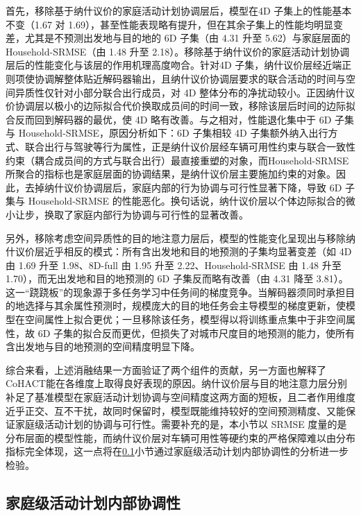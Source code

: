 首先，移除基于纳什议价的家庭活动计划协调层后，模型在4D 子集上的性能基本不变（1.67 对 1.69），甚至性能表现略有提升，但在其余子集上的性能均明显变差，尤其是不预测出发地与目的地的 6D 子集（由 4.31 升至 5.62）与家庭层面的 Household-SRMSE（由 1.48 升至 2.18）。移除基于纳什议价的家庭活动计划协调层后的性能变化与该层的作用机理高度吻合。针对4D 子集，纳什议价层经近端正则项使协调解整体贴近解码器输出，且纳什议价协调层要求的联合活动的时间与空间异质性仅针对小部分联合出行成员，对 4D 整体分布的净扰动较小。正因纳什议价协调层以极小的边际拟合代价换取成员间的时间一致，移除该层后时间的边际拟合反而回到解码器的最优，使 4D 略有改善。与之相对，性能退化集中于 6D 子集与 Household-SRMSE，原因分析如下：6D 子集相较 4D 子集额外纳入出行方式、联合出行与驾驶等行为属性，正是纳什议价层经车辆可用性约束与联合一致性约束（耦合成员间的方式与联合出行）最直接重塑的对象，而Household-SRMSE所聚合的指标也是家庭层面的协调结果，是纳什议价层主要施加约束的对象。因此，去掉纳什议价协调层后，家庭内部的行为协调与可行性显著下降，导致 6D 子集与 Household-SRMSE 的性能恶化。换句话说，纳什议价层以个体边际拟合的微小让步，换取了家庭内部行为协调与可行性的显著改善。

另外，移除考虑空间异质性的目的地注意力层后，模型的性能变化呈现出与移除纳什议价层近乎相反的模式：所有含出发地和目的地预测的子集均显著变差（如 4D 由 1.69 升至 1.98、8D-full 由 1.95 升至 2.22、Household-SRMSE 由 1.48 升至 1.70），而无出发地和目的地预测的 6D 子集反而略有改善（由 4.31 降至 3.81）。这一``跷跷板''的现象源于多任务学习中任务间的梯度竞争。当解码器须同时承担目的地选择与其余属性预测时，规模庞大的目的地任务会主导模型的梯度更新，使模型在空间属性上拟合更优；一旦移除该任务，模型得以将训练重点集中于非空间属性，故 6D 子集的拟合反而更优，但损失了对城市尺度目的地预测的能力，使所有含出发地与目的地预测的空间精度明显下降。

综合来看，上述消融结果一方面验证了两个组件的贡献，另一方面也解释了CoHACT能在各维度上取得良好表现的原因。纳什议价层与目的地注意力层分别补足了基准模型在家庭活动计划协调与空间精度这两方面的短板，且二者作用维度近乎正交、互不干扰，故同时保留时，模型既能维持较好的空间预测精度、又能保证家庭级活动计划的协调与可行性。需要补充的是，本小节以 SRMSE 度量的是分布层面的模型性能，而纳什议价层对车辆可用性等硬约束的严格保障难以由分布指标完全体现，这一点将在\ref{subsec.cohact.experiment.coord}小节通过家庭级活动计划内部协调性的分析进一步检验。

\subsection{家庭级活动计划内部协调性}\label{subsec.cohact.experiment.coord}

